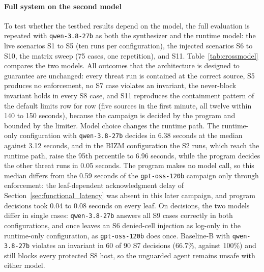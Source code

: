 \documentclass[final,5p]{elsarticle}
\begin{document}
\paragraph{Full system on the second model}
To test whether the testbed results depend on the model, the full evaluation is repeated with \texttt{qwen-3.8-27b} as both the synthesizer and the runtime model: the live scenarios S1 to S5 (ten runs per configuration), the injected scenarios S6 to S10, the matrix sweep (75 cases, one repetition), and S11. Table~\ref{tab:crossmodel} compares the two models. All outcomes that the architecture is designed to guarantee are unchanged: every threat run is contained at the correct source, S5 produces no enforcement, no S7 case violates an invariant, the never-block invariant holds in every S8 case, and S11 reproduces the containment pattern of the default limits row for row (five sources in the first minute, all twelve within 140 to 150 seconds), because the campaign is decided by the program and bounded by the limiter. Model choice changes the runtime path. The runtime-only configuration with \texttt{qwen-3.8-27b} decides in 6.38 seconds at the median against 3.12 seconds, and in the BIZM configuration the S2 runs, which reach the runtime path, raise the 95th percentile to 6.96 seconds, while the program decides the other threat runs in 0.05 seconds. The program makes no model call, so this median differs from the 0.59 seconds of the \texttt{gpt-oss-120b} campaign only through enforcement: the leaf-dependent acknowledgment delay of Section~\ref{sec:functional_latency} was absent in this later campaign, and program decisions took 0.04 to 0.08 seconds on every leaf. On decisions, the two models differ in single cases: \texttt{qwen-3.8-27b} answers all S9 cases correctly in both configurations, and once leaves an S6 denied-cell injection as log-only in the runtime-only configuration, as \texttt{gpt-oss-120b} does once. Baseline-B with \texttt{qwen-3.8-27b} violates an invariant in 60 of 90 S7 decisions (66.7\%, against 100\%) and still blocks every protected S8 host, so the unguarded agent remains unsafe with either model.
\end{document}

